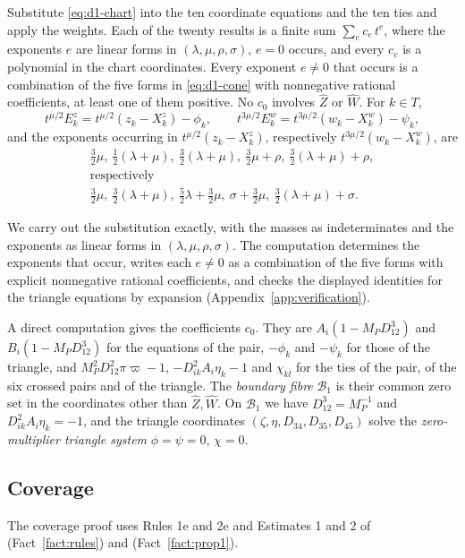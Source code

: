 \begin{lemma}\label{lem:d1-chart}
Substitute \eqref{eq:d1-chart} into the ten coordinate equations and the ten ties and apply the
weights.  Each of the twenty results is a finite sum $\sum_ec_e\,t^e$, where the exponents $e$
are linear forms in $(\lambda,\mu,\rho,\sigma)$, $e=0$ occurs, and every $c_e$ is a polynomial in
the chart coordinates.  Every exponent $e\ne0$ that occurs is a combination of the five forms in
\eqref{eq:d1-cone} with nonnegative rational coefficients, at least one of them positive.  No
$c_0$ involves $\hat Z$ or $\hat W$.  For $k\in T$,
\[
  t^{\mu/2}E^z_k=t^{\mu/2}(z_k-X^z_k)-\phi_k,\qquad
  t^{3\mu/2}E^w_k=t^{3\mu/2}(w_k-X^w_k)-\psi_k,
\]
and the exponents occurring in $t^{\mu/2}(z_k-X^z_k)$, respectively $t^{3\mu/2}(w_k-X^w_k)$, are
\[
\begin{gathered}
  \tfrac32\mu,\ \tfrac12(\lambda+\mu),\ \tfrac32(\lambda+\mu),\ \tfrac32\mu+\rho,\
  \tfrac32(\lambda+\mu)+\rho,\\
  \text{respectively}\\
  \tfrac32\mu,\ \tfrac32(\lambda+\mu),\ \tfrac52\lambda+\tfrac32\mu,\ \sigma+\tfrac32\mu,\
  \tfrac32(\lambda+\mu)+\sigma .
\end{gathered}
\]
\end{lemma}
We carry out the substitution exactly, with the masses as indeterminates and the exponents as
linear forms in $(\lambda,\mu,\rho,\sigma)$.  The computation determines the exponents that
occur, writes each $e\ne0$ as a combination of the five forms with explicit nonnegative rational
coefficients, and checks the displayed identities for the triangle equations by expansion
(Appendix~\ref{app:verification}).

A direct computation gives the coefficients $c_0$.  They are $A_i(1-M_PD_{12}^3)$ and
$B_i(1-M_PD_{12}^3)$ for the equations of the pair, $-\phi_k$ and $-\psi_k$ for those of the
triangle, and $M_P^2D_{12}^2\pi\varpi-1$, $-D_{ik}^2A_i\eta_k-1$ and $\chi_{kl}$ for the ties of
the pair, of the six crossed pairs and of the triangle.
The \emph{boundary fibre} $\mathcal B_1$ is their common zero set in the coordinates other than
$\hat Z,\hat W$.  On $\mathcal B_1$ we have $D_{12}^3=M_P^{-1}$ and $D_{ik}^2A_i\eta_k=-1$, and the
triangle coordinates $(\zeta,\eta,D_{34},D_{35},D_{45})$ solve the \emph{zero-multiplier triangle
system} $\phi=\psi=0$, $\chi=0$.

\subsection{Coverage}
The coverage proof uses Rules 1e and 2e and Estimates 1 and 2 of \cite[\S3]{AK}
(Fact~\ref{fact:rules}) and \cite[Prop.~1]{AK} (Fact~\ref{fact:prop1}).

